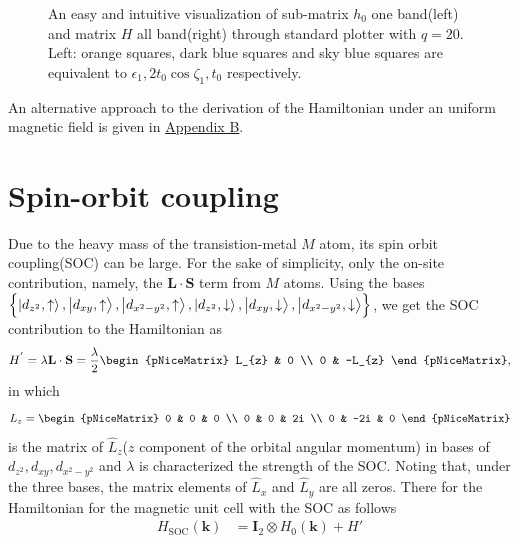 \documentclass{report}
\newcommand{\f}[2]{\dfrac{#1}{#2}}
\begin{document}
\begin{figure}[htb]
\begin{subfigure}[b]{0.495\textwidth}
		\label{fig:1 band matrix}
	\end{subfigure}
	\caption{
		An easy and intuitive visualization of sub-matrix $h_{0}$ one band(left) and matrix $H$ all band(right) through standard plotter with $q = 20$. Left: orange squares, dark blue squares and sky blue squares are equivalent to $\epsilon_{1}, 2 t_{0} \cos \zeta_{1}, t_{0}$ respectively.
	}
\end{figure}

An alternative approach to the derivation of the Hamiltonian under an uniform magnetic field is given in \hyperref[appendix b]{Appendix B}.

\newpage
\section{Spin-orbit coupling}
Due to the heavy mass of the transistion-metal $M$ atom, its spin orbit coupling(SOC) can be large. For the sake of simplicity, only the on-site contribution, namely, the $\mathbf{L \cdot S}$ term from $M$ atoms. Using the bases $\left\{\ket{d_{z^{2}},\uparrow},\ket{d_{xy},\uparrow},\ket{d_{x^{2} - y^{2}},\uparrow},\ket{d_{z^{2}},\downarrow},\ket{d_{xy},\downarrow},\ket{d_{x^{2} - y^{2} },\downarrow}\right\}$, we get the SOC contribution to the Hamiltonian as
\begin{gather}
	H^{'}
	= \lambda \mathbf{L \cdot S}
	= \f{\lambda}{2}
	\begin{pNiceMatrix}
		L_{z} & 0      \\
		0     & -L_{z}
	\end{pNiceMatrix},
\end{gather}
in which
\begin{gather}
	L_{z}
	=
	\begin{pNiceMatrix}
		0 & 0   & 0  \\
		0 & 0   & 2i \\
		0 & -2i & 0
	\end{pNiceMatrix}
\end{gather}
is the matrix of $\hat{L}_{z}$($z$ component of the orbital angular momentum) in bases of $d_{z^{2}},d_{xy},d_{x^{2} - y^{2}}$ and $\lambda$ is characterized the strength of the SOC. Noting that, under the three bases, the matrix elements of $\hat{L}_{x}$ and $\hat{L}_{y}$ are all zeros. There for the Hamiltonian for the magnetic unit cell with the SOC as follows
\begin{equation}
	\begin{aligned}
		H_{\text{SOC}}(\mathbf{k})
		 & = \mathbf{I}_{2} \otimes H_{0}(\mathbf{k}) + H'
	\end{aligned}
\end{equation}
\end{document}
